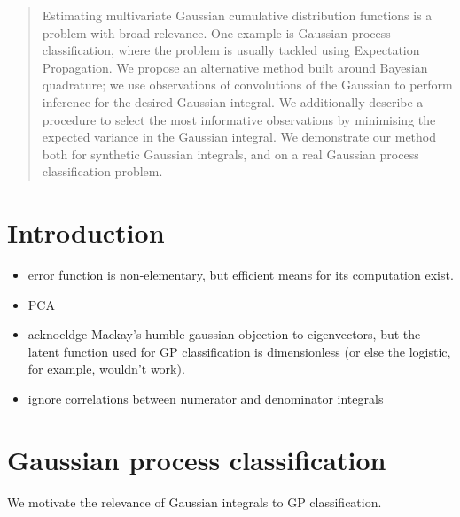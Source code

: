 \documentclass[twoside]{article}
\begin{document}

\begin{abstract}%
Estimating multivariate Gaussian cumulative distribution functions is a problem with broad relevance. One example is Gaussian process classification, where the problem is usually tackled using Expectation Propagation. We propose an alternative method built around Bayesian quadrature; we use observations of convolutions of the Gaussian to perform inference for the desired Gaussian integral. We additionally describe a procedure to select the most informative observations by minimising the expected variance in the Gaussian integral. We demonstrate our method both for synthetic Gaussian integrals, and on a real Gaussian process classification problem. 
\end{abstract}


\section{Introduction}

\begin{itemize}
 \item error function is non-elementary, but efficient means for its computation exist. 
 \item PCA
 \item acknoeldge Mackay's humble gaussian objection to eigenvectors, but the latent function used for GP classification is dimensionless (or else the logistic, for example, wouldn't work).
\item ignore correlations between numerator and denominator integrals
\end{itemize}

\section{Gaussian process classification}

We motivate the relevance of Gaussian integrals to GP classification.
\end{document}
